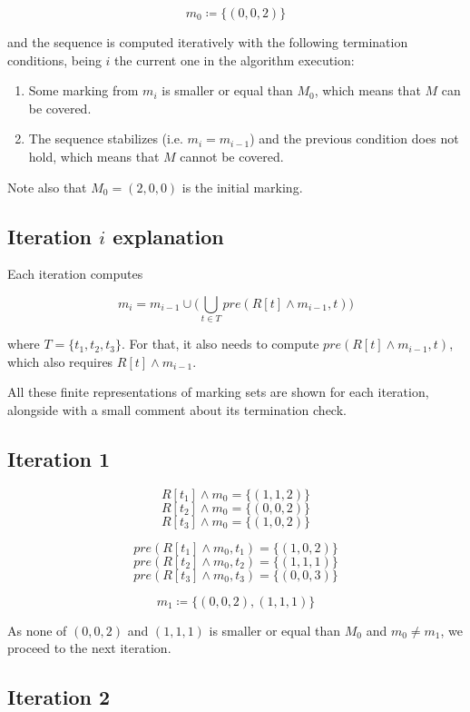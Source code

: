 \documentclass{article}
\begin{document}
$$m_0 \coloneqq \{ (0, 0, 2) \}$$

and the sequence is computed iteratively with the following 
termination conditions, being $i$ the current one in 
the algorithm execution:

\begin{enumerate}
  \item Some marking from $m_i$ is smaller or equal than $M_0$, 
    which means that $M$ can be covered.
  \item The sequence stabilizes (i.e. $m_i = m_{i - 1}$) and the 
  previous condition does not hold, which means that $M$ cannot be covered.
\end{enumerate}

Note also that $M_0 = (2, 0, 0)$ is the initial marking. 

\subsection*{Iteration $i$ explanation}

Each iteration computes 

$$
  m_i = m_{i - 1} \cup 
    \Big(
      \bigcup\limits_{t \in T} pre(R[t] \land m_{i - 1}, t)
    \Big)
$$

where $T = \{ t_1, t_2, t_3 \}$. For that, it also needs to compute
$pre(R[t] \land m_{i - 1}, t)$, which also requires  
$R[t] \land m_{i - 1}$.

All these finite representations of marking sets are shown for 
each iteration, alongside with a small comment about its termination 
check.

\subsection*{Iteration 1}

$$R[t_1] \land m_0 = \{ (1, 1, 2) \}$$
$$R[t_2] \land m_0 = \{ (0, 0, 2) \}$$
$$R[t_3] \land m_0 = \{ (1, 0, 2) \}$$

$$pre(R[t_1] \land m_0, t_1) = \{ (1, 0, 2) \}$$
$$pre(R[t_2] \land m_0, t_2) = \{ (1, 1, 1) \}$$
$$pre(R[t_3] \land m_0, t_3) = \{ (0, 0, 3) \}$$

$$m_1 \coloneqq \{ (0, 0, 2), (1, 1, 1) \}$$

As none of $(0, 0, 2)$ and $(1, 1, 1)$ is smaller or equal than 
$M_0$ and $m_0 \neq m_1$, we proceed to the next iteration.

\subsection*{Iteration 2}
\end{document}
